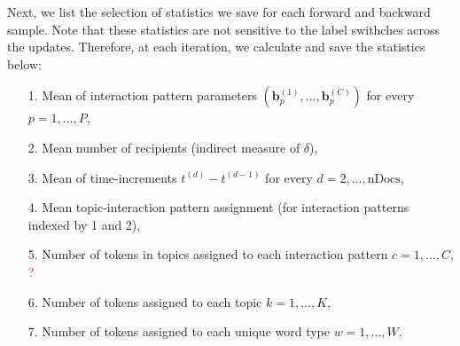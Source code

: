 \documentclass[a4paper]{article}
\begin{document}
   Next, we list the selection of statistics we save for each forward and backward sample. Note that these statistics are not sensitive to the label swithches across the updates. Therefore, at each iteration, we calculate and save the statistics below:
      \begin{itemize}
      	\item[1.] Mean of interaction pattern parameters $(\boldsymbol{b}_p^{(1)},...,\boldsymbol{b}_p^{(C)})$ for every $p = 1,...,P$,
      	\item[2.] Mean number of recipients (indirect measure of $\delta$),
      	\item[3.] Mean of time-increments $t^{(d)}-t^{(d-1)}$ for every $d=2,...,\mbox{nDocs}$,
      	\item[4.] Mean topic-interaction pattern assignment (for interaction patterns indexed by 1 and 2), 
      	\item[5.] Number of tokens in topics assigned to each interaction pattern $c=1,...,C$, \textcolor{red}{?}
      	\item[6.] Number of tokens assigned to each topic $k=1,...,K$, 
       \item[7.] Number of tokens assigned to each unique word type $w=1,...,W$.
      	      \end{itemize}
\end{document}
